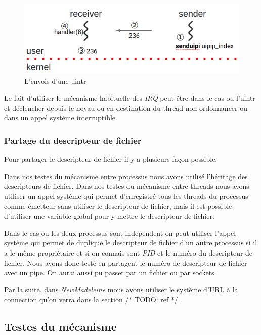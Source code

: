 \begin{figure}[H]
  \includegraphics[width=\textwidth]{images/uintrSend.png}
  \caption{L'envois d'une uintr}
  \label{fig:sendUintr}
\end{figure}

Le fait d'utiliser le mécanisme habituelle des \emph{IRQ} peut être dans le cas ou l'uintr et déclencher depuis le noyau ou en destination du thread non ordonnancer ou dans un appel système interruptible.

\subsubsection{Partage du descripteur de fichier}
\label{sec:shareFD}

Pour partager le descripteur de fichier il y a plusieurs façon possible.

Dans nos testes du mécanisme entre processus nous avons utilisé l'héritage des descripteurs de fichier.
Dans nos testes du mécanisme entre threads nous avons utiliser un appel système qui permet d'enregistré tous les threads du processus comme émetteur sans utiliser le descripteur de fichier, %
mais il est possible d'utiliser une variable global pour y mettre le descripteur de fichier.

Dans le cas ou les deux processus sont independent on peut utiliser l'appel système  qui permet de dupliqué le descripteur de fichier d'un autre processus si il a le même propriétaire et si on connais sont \emph{PID} et le numéro du descripteur de fichier.
Nous avons donc testé en partagent le numéro de descripteur de fichier avec un pipe.
On aurai aussi pu passer par un fichier ou par sockets.

Par la suite, dans \emph{NewMadeleine} mous avons utiliser le système d'URL à la connection qu'on verra dans la section /* TODO: ref */.

\subsection{Testes du mécanisme}

